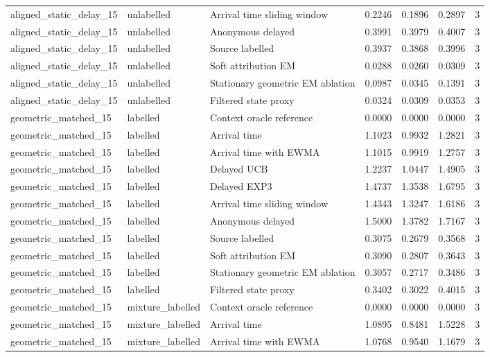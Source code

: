 \begin{tabular}{llllllr}
aligned\_static\_delay\_15 & unlabelled & Arrival time sliding window & 0.2246 & 0.1896 & 0.2897 & 3 \\
aligned\_static\_delay\_15 & unlabelled & Anonymous delayed & 0.3991 & 0.3979 & 0.4007 & 3 \\
aligned\_static\_delay\_15 & unlabelled & Source labelled & 0.3937 & 0.3868 & 0.3996 & 3 \\
aligned\_static\_delay\_15 & unlabelled & Soft attribution EM & 0.0288 & 0.0260 & 0.0309 & 3 \\
aligned\_static\_delay\_15 & unlabelled & Stationary geometric EM ablation & 0.0987 & 0.0345 & 0.1391 & 3 \\
aligned\_static\_delay\_15 & unlabelled & Filtered state proxy & 0.0324 & 0.0309 & 0.0353 & 3 \\
geometric\_matched\_15 & labelled & Context oracle reference & 0.0000 & 0.0000 & 0.0000 & 3 \\
geometric\_matched\_15 & labelled & Arrival time & 1.1023 & 0.9932 & 1.2821 & 3 \\
geometric\_matched\_15 & labelled & Arrival time with EWMA & 1.1015 & 0.9919 & 1.2757 & 3 \\
geometric\_matched\_15 & labelled & Delayed UCB & 1.2237 & 1.0447 & 1.4905 & 3 \\
geometric\_matched\_15 & labelled & Delayed EXP3 & 1.4737 & 1.3538 & 1.6795 & 3 \\
geometric\_matched\_15 & labelled & Arrival time sliding window & 1.4343 & 1.3247 & 1.6186 & 3 \\
geometric\_matched\_15 & labelled & Anonymous delayed & 1.5000 & 1.3782 & 1.7167 & 3 \\
geometric\_matched\_15 & labelled & Source labelled & 0.3075 & 0.2679 & 0.3568 & 3 \\
geometric\_matched\_15 & labelled & Soft attribution EM & 0.3090 & 0.2807 & 0.3643 & 3 \\
geometric\_matched\_15 & labelled & Stationary geometric EM ablation & 0.3057 & 0.2717 & 0.3486 & 3 \\
geometric\_matched\_15 & labelled & Filtered state proxy & 0.3402 & 0.3022 & 0.4015 & 3 \\
geometric\_matched\_15 & mixture\_labelled & Context oracle reference & 0.0000 & 0.0000 & 0.0000 & 3 \\
geometric\_matched\_15 & mixture\_labelled & Arrival time & 1.0895 & 0.8481 & 1.5228 & 3 \\
geometric\_matched\_15 & mixture\_labelled & Arrival time with EWMA & 1.0768 & 0.9540 & 1.1679 & 3 \\

\end{tabular}
